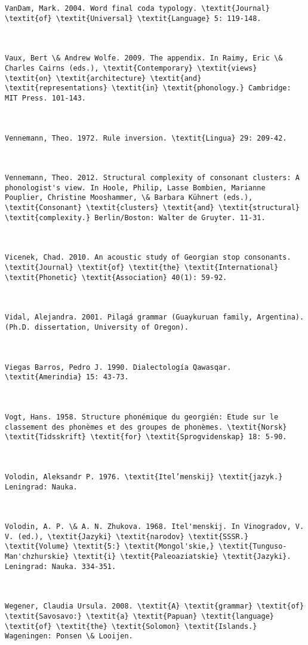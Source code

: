 \begin{verbatim}
VanDam, Mark. 2004. Word final coda typology. \textit{Journal} \textit{of} \textit{Universal} \textit{Language} 5: 119-148.



Vaux, Bert \& Andrew Wolfe. 2009. The appendix. In Raimy, Eric \& Charles Cairns (eds.), \textit{Contemporary} \textit{views} \textit{on} \textit{architecture} \textit{and} \textit{representations} \textit{in} \textit{phonology.} Cambridge: MIT Press. 101-143.



Vennemann, Theo. 1972. Rule inversion. \textit{Lingua} 29: 209-42.



Vennemann, Theo. 2012. Structural complexity of consonant clusters: A phonologist's view. In Hoole, Philip, Lasse Bombien, Marianne Pouplier, Christine Mooshammer, \& Barbara Kühnert (eds.), \textit{Consonant} \textit{clusters} \textit{and} \textit{structural} \textit{complexity.} Berlin/Boston: Walter de Gruyter. 11-31.



Vicenek, Chad. 2010. An acoustic study of Georgian stop consonants. \textit{Journal} \textit{of} \textit{the} \textit{International} \textit{Phonetic} \textit{Association} 40(1): 59-92.



Vidal, Alejandra. 2001. Pilagá grammar (Guaykuruan family, Argentina). (Ph.D. dissertation, University of Oregon).



Viegas Barros, Pedro J. 1990. Dialectología Qawasqar. \textit{Amerindia} 15: 43-73.



Vogt, Hans. 1958. Structure phonémique du georgién: Etude sur le classement des phonèmes et des groupes de phonèmes. \textit{Norsk} \textit{Tidsskrift} \textit{for} \textit{Sprogvidenskap} 18: 5-90.



Volodin, Aleksandr P. 1976. \textit{Itel’menskij} \textit{jazyk.} Leningrad: Nauka. 



Volodin, A. P. \& A. N. Zhukova. 1968. Itel'menskij. In Vinogradov, V. V. (ed.), \textit{Jazyki} \textit{narodov} \textit{SSSR.} \textit{Volume} \textit{5:} \textit{Mongol'skie,} \textit{Tunguso-Man'chzhurskie} \textit{i} \textit{Paleoaziatskie} \textit{Jazyki}. Leningrad: Nauka. 334-351.



Wegener, Claudia Ursula. 2008. \textit{A} \textit{grammar} \textit{of} \textit{Savosavo:} \textit{a} \textit{Papuan} \textit{language} \textit{of} \textit{the} \textit{Solomon} \textit{Islands.} Wageningen: Ponsen \& Looijen.




\end{verbatim}
